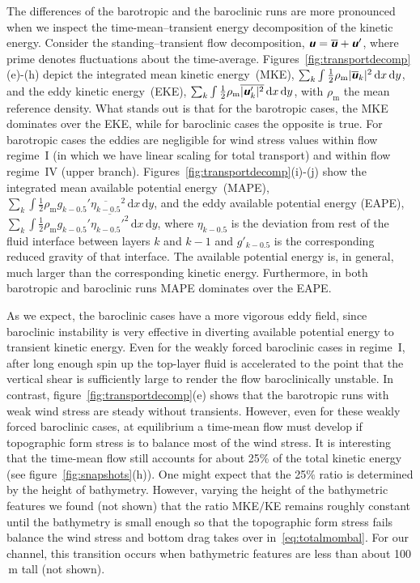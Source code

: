 \documentclass{agujournal2019}
\newcommand{\mathbfit}[1]{\textbf{\textit{\textsf{#1}}}}
\newcommand{\bu}		{\mathbfit u}
\newcommand{\half}		{\tfrac{1}{2}}
\newcommand{\rhom} {\rho_{\mathrm{m}}}
\begin{document}
The differences of the barotropic and the baroclinic runs are more pronounced when we inspect the time-mean--transient energy decomposition of the kinetic energy. Consider the standing--transient flow decomposition, $\bu = \overline{\bu}+\bu'$, where prime denotes fluctuations about the time-average. Figures~\ref{fig:transportdecomp}(e)-(h) depict the integrated mean kinetic energy~(MKE), $\sum_k \int\half \rhom |\overline{\bu}_k|^2\,\mathrm{d}x\,\mathrm{d}y$, and the eddy kinetic energy~(EKE),  $\sum_k \int \half\rhom \overline{|\bu'_k|^2}\,\mathrm{d}x\,\mathrm{d}y$, with $\rhom$ the mean reference density. What stands out is that for the barotropic cases, the MKE dominates over the EKE, while for baroclinic cases the opposite is true. For barotropic cases the eddies are negligible for wind stress values within flow regime~I (in which we have linear scaling for total transport) and within flow regime~IV (upper branch). {\color{black}Figures~\ref{fig:transportdecomp}(i)-(j) show the integrated mean available potential energy~(MAPE), $\sum_k \int \half \rhom g_{k-0.5}' \overline{\eta_{k-0.5}}^2\,\mathrm{d}x\,\mathrm{d}y$, and the eddy available potential energy (EAPE), $\sum_k \int \half \rhom g_{k-0.5}' \overline{\eta_{k-0.5}'^2}\,\mathrm{d}x\,\mathrm{d}y$, where $\eta_{k-0.5}$ is the deviation from rest of the fluid interface between layers $k$ and $k-1$ and $g'_{k-0.5}$ is the corresponding reduced gravity of that interface. The available potential energy is, in general, much larger than the corresponding kinetic energy. Furthermore, in both barotropic and baroclinic runs MAPE dominates over the EAPE.}

As we expect, the baroclinic cases have a  more vigorous eddy field, since baroclinic instability is very effective in diverting available potential energy to transient kinetic energy. Even for the weakly forced baroclinic cases in regime~I, after long enough spin up the top-layer fluid is accelerated to the point that the vertical shear is sufficiently large to render the flow baroclinically unstable. In contrast, figure~\ref{fig:transportdecomp}(e) shows that the barotropic runs with weak wind stress are steady without transients.  However, even for these weakly forced baroclinic cases, at equilibrium a time-mean flow must develop if topographic form stress is to balance most of the wind stress. It is interesting that the time-mean flow still accounts for about 25\% of the total kinetic energy (see figure~\ref{fig:snapshots}(h)). One might expect that the 25\% ratio is determined by the height of bathymetry. However, varying the height of the bathymetric features we found (not shown) that the ratio MKE$/$KE remains roughly constant until the bathymetry is small enough so that the topographic form stress fails balance the wind stress and bottom drag takes over in~\eqref{eq:totalmombal}. For our channel, this transition occurs when bathymetric features are less than about 100$\,\text{m}$ tall (not shown).
\end{document}
